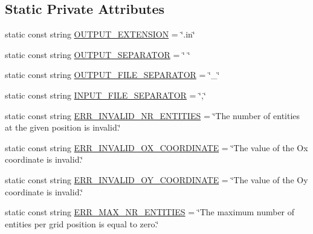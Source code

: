 \subsection*{\-Static \-Private \-Attributes}
\begin{DoxyCompactItemize}
\item 
static const string \hyperlink{classmultiscale_1_1video_1_1RectangularEntityCsvToInputFilesConverter_a44d18b9a690ed20e90f9394bec2756ec}{\-O\-U\-T\-P\-U\-T\-\_\-\-E\-X\-T\-E\-N\-S\-I\-O\-N} = \char`\"{}.in\char`\"{}
\item 
static const string \hyperlink{classmultiscale_1_1video_1_1RectangularEntityCsvToInputFilesConverter_ad4f94a566c0a2d0f62c38f7e249150f0}{\-O\-U\-T\-P\-U\-T\-\_\-\-S\-E\-P\-A\-R\-A\-T\-O\-R} = \char`\"{} \char`\"{}
\item 
static const string \hyperlink{classmultiscale_1_1video_1_1RectangularEntityCsvToInputFilesConverter_a4d61fef18668092722ffb876b4bf7dee}{\-O\-U\-T\-P\-U\-T\-\_\-\-F\-I\-L\-E\-\_\-\-S\-E\-P\-A\-R\-A\-T\-O\-R} = \char`\"{}\-\_\-\char`\"{}
\item 
static const string \hyperlink{classmultiscale_1_1video_1_1RectangularEntityCsvToInputFilesConverter_aad85f336862a4a83f8836acc67640d32}{\-I\-N\-P\-U\-T\-\_\-\-F\-I\-L\-E\-\_\-\-S\-E\-P\-A\-R\-A\-T\-O\-R} = \char`\"{},\char`\"{}
\item 
static const string \hyperlink{classmultiscale_1_1video_1_1RectangularEntityCsvToInputFilesConverter_ae0bf7e72a315701da331eadb1e76e46b}{\-E\-R\-R\-\_\-\-I\-N\-V\-A\-L\-I\-D\-\_\-\-N\-R\-\_\-\-E\-N\-T\-I\-T\-I\-E\-S} = \char`\"{}\-The number of entities at the given position is invalid.\char`\"{}
\item 
static const string \hyperlink{classmultiscale_1_1video_1_1RectangularEntityCsvToInputFilesConverter_a35bb61f22ff213122447ae86f40474c2}{\-E\-R\-R\-\_\-\-I\-N\-V\-A\-L\-I\-D\-\_\-\-O\-X\-\_\-\-C\-O\-O\-R\-D\-I\-N\-A\-T\-E} = \char`\"{}\-The value of the \-Ox coordinate is invalid.\char`\"{}
\item 
static const string \hyperlink{classmultiscale_1_1video_1_1RectangularEntityCsvToInputFilesConverter_a6c34afd00b95610977a85d9178c58559}{\-E\-R\-R\-\_\-\-I\-N\-V\-A\-L\-I\-D\-\_\-\-O\-Y\-\_\-\-C\-O\-O\-R\-D\-I\-N\-A\-T\-E} = \char`\"{}\-The value of the \-Oy coordinate is invalid.\char`\"{}
\item 
static const string \hyperlink{classmultiscale_1_1video_1_1RectangularEntityCsvToInputFilesConverter_a75b3b08c6c220812ea71f7bc07223cdb}{\-E\-R\-R\-\_\-\-M\-A\-X\-\_\-\-N\-R\-\_\-\-E\-N\-T\-I\-T\-I\-E\-S} = \char`\"{}\-The maximum number of entities per grid position is equal to zero.\char`\"{}

\end{DoxyCompactItemize}

